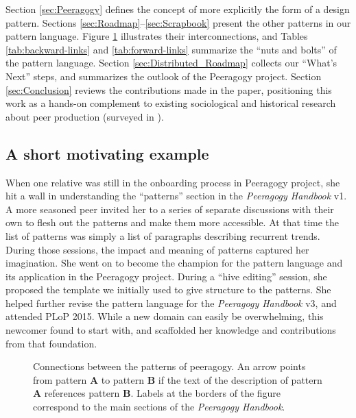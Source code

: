 Section \ref{sec:Peeragogy} defines the concept of  more explicitly the form of a design pattern.  Sections \ref{sec:Roadmap}--\ref{sec:Scrapbook} present the other patterns in our pattern language. Figure \ref{fig:connections} illustrates their interconnections, and Tables \ref{tab:backward-links} and \ref{tab:forward-links} summarize the ``nuts and bolts'' of the pattern language.
Section \ref{sec:Distributed_Roadmap} collects our ``What's Next'' steps, and summarizes the outlook of the Peeragogy project.  Section \ref{sec:Conclusion} reviews the contributions made in the paper, positioning this work as a hands-on complement to existing sociological and historical research about peer production (surveyed in \cite{benkler2015peer}).

\subsection*{A short motivating example}
When one relative  was still in the onboarding process in Peeragogy project, she hit a wall in understanding the ``patterns'' section in the \emph{Peeragogy Handbook} v1.  A more seasoned peer invited her to a series of separate discussions with their own  to flesh out the patterns and make them more accessible.  At that time the list of patterns was simply a list of paragraphs describing recurrent trends.  During those sessions, the impact and meaning of patterns captured her imagination.  She went on to become the champion for the pattern language and its application in the Peeragogy project.  During a ``hive editing'' session, she proposed the template we initially used to give structure to the patterns.  She helped further revise the pattern language for the \emph{Peeragogy Handbook}  v3, and attended PLoP 2015.  While a new domain can easily be overwhelming, this newcomer found  to start with, and scaffolded her knowledge and contributions from that foundation.

\begin{figure}
\vspace{-.9in}
{\centering


\par
}
\vspace{-.9in}
\caption{Connections between the patterns of peeragogy.  An arrow points from pattern \textbf{A} to pattern \textbf{B} if the text of the description of pattern \textbf{A} references pattern \textbf{B}.  Labels at the borders of the figure correspond to the main sections of the \emph{Peeragogy Handbook}.\label{fig:connections}}
\end{figure}

